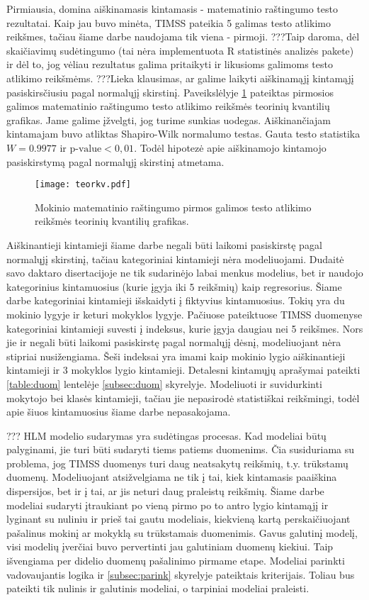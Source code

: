 \documentclass[12pt,a4paper]{article}
\begin{document}
\indent Pirmiausia, domina aiškinamasis kintamasis - matematinio raštingumo testo rezultatai. Kaip jau buvo minėta, TIMSS pateikia 5 galimas testo atlikimo reikšmes, tačiau šiame darbe naudojama tik viena - pirmoji. ???Taip daroma, dėl skaičiavimų sudėtingumo (tai nėra implementuota R statistinės analizės pakete) ir dėl to, jog vėliau rezultatus galima pritaikyti ir likusioms galimoms testo atlikimo reikšmėms. 
???Lieka klausimas, ar galime laikyti aiškinamąjį kintamąjį pasiskirsčiusiu pagal normalųjį skirstinį. Paveikslėlyje \ref{fig:y} pateiktas pirmosios galimos matematinio raštingumo testo atlikimo reikšmės teorinių kvantilių grafikas. Jame galime įžvelgti, jog turime sunkias uodegas. Aiškinančiajam kintamajam buvo atliktas Shapiro-Wilk normalumo testas. Gauta testo statistika $W = 0.9977$ ir $\text{p-value}<0,01$. Todėl hipotezė apie aiškinamojo kintamojo pasiskirstymą pagal normalųjį skirstinį atmetama.

\begin{figure}[H]
\centering
\texttt{[image: teorkv.pdf]}
\caption{Mokinio matematinio raštingumo pirmos galimos testo atlikimo reikšmės teorinių kvantilių grafikas.}
\label{fig:y}
\end{figure}

\indent Aiškinantieji kintamieji šiame darbe negali būti laikomi pasiskirstę pagal normalųjį skirstinį, tačiau kategoriniai kintamieji nėra modeliuojami. Dudaitė savo daktaro disertacijoje \cite{liet2003} ne tik sudarinėjo labai menkus modelius, bet ir naudojo kategorinius kintamuosius (kurie įgyja iki 5 reikšmių) kaip regresorius. Šiame darbe kategoriniai kintamieji išskaidyti į fiktyvius kintamuosius. Tokių yra du mokinio lygyje ir keturi mokyklos lygyje. Pačiuose pateiktuose TIMSS duomenyse kategoriniai kintamieji suvesti į indeksus, kurie įgyja daugiau nei 5 reikšmes. Nors jie ir negali būti laikomi pasiskirstę pagal normalųjį dėsnį, modeliuojant nėra stipriai nusižengiama. Šeši indeksai yra imami kaip mokinio lygio aiškinantieji kintamieji ir 3 mokyklos lygio kintamieji. Detalesni kintamųjų aprašymai pateikti \ref{table:duom} lentelėje \ref{subsec:duom} skyrelyje. Modeliuoti ir suvidurkinti mokytojo bei klasės kintamieji, tačiau jie nepasirodė statistiškai reikšmingi, todėl apie šiuos kintamuosius šiame darbe nepasakojama.

\indent ??? HLM modelio sudarymas yra sudėtingas procesas. Kad modeliai būtų palyginami, jie turi būti sudaryti tiems patiems duomenims. Čia susiduriama su problema, jog TIMSS duomenys turi daug neatsakytų reikšmių, t.y. trūkstamų duomenų. Modeliuojant atsižvelgiama ne tik į tai, kiek kintamasis paaiškina dispersijos, bet ir į tai, ar jis neturi daug praleistų reikšmių. Šiame darbe modeliai sudaryti įtraukiant po vieną pirmo po to antro lygio kintamąjį ir lyginant su nuliniu ir prieš tai gautu modeliais, kiekvieną kartą perskaičiuojant pašalinus mokinį ar mokyklą su trūkstamais duomenimis. Gavus galutinį modelį, visi modelių įverčiai buvo pervertinti jau galutiniam duomenų kiekiui. Taip išvengiama per didelio duomenų pašalinimo pirmame etape. Modeliai parinkti vadovaujantis logika ir \ref{subsec:parink} skyrelyje pateiktais kriterijais. Toliau bus pateikti tik nulinis ir galutinis modeliai, o tarpiniai modeliai praleisti.
\end{document}
